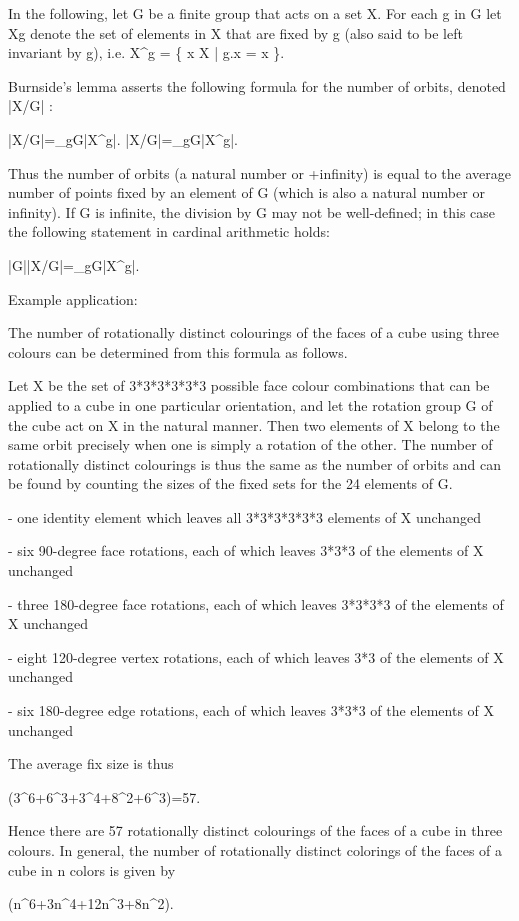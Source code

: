 In the following, let G be a finite group that acts on a set X. For each g in G let Xg denote the set of elements in X that are fixed by g (also said to be left invariant by g), i.e. X^g = \{ x \in X | g.x = x \}.

Burnside's lemma asserts the following formula for the number of orbits, denoted {\displaystyle |X/G| }:


{\displaystyle |X/G|={}\sum _{g\in G}|X^{g}|.} |X/G|={}\sum _{{g\in G}}|X^{g}|.


Thus the number of orbits (a natural number or +infinity) is equal to the average number of points fixed by an element of G (which is also a natural number or infinity). If G is infinite, the division by G may not be well-defined; in this case the following statement in cardinal arithmetic holds:


{\displaystyle |G||X/G|=\sum _{g\in G}|X^{g}|.}


Example application:

The number of rotationally distinct colourings of the faces of a cube using three colours can be determined from this formula as follows.

Let X be the set of 3*3*3*3*3*3 possible face colour combinations that can be applied to a cube in one particular orientation, and let the rotation group G of the cube act on X in the natural manner. Then two elements of X belong to the same orbit precisely when one is simply a rotation of the other. The number of rotationally distinct colourings is thus the same as the number of orbits and can be found by counting the sizes of the fixed sets for the 24 elements of G.


- one identity element which leaves all 3*3*3*3*3*3 elements of X unchanged

- six 90-degree face rotations, each of which leaves 3*3*3 of the elements of X unchanged

- three 180-degree face rotations, each of which leaves 3*3*3*3 of the elements of X unchanged

- eight 120-degree vertex rotations, each of which leaves 3*3 of the elements of X unchanged

- six 180-degree edge rotations, each of which leaves 3*3*3 of the elements of X unchanged

The average fix size is thus

{\left(3^{6}+6^{3}+3^{4}+8^{2}+6^{3}\right)=57.}

Hence there are 57 rotationally distinct colourings of the faces of a cube in three colours. In general, the number of rotationally distinct colorings of the faces of a cube in n colors is given by

{\left(n^{6}+3n^{4}+12n^{3}+8n^{2}\right).}
